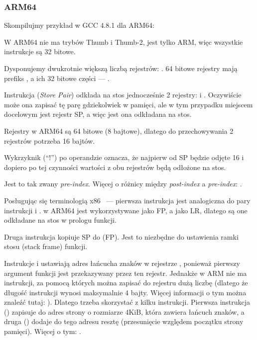 \subsubsection{ARM64}


Skompilujmy przykład w GCC 4.8.1 dla ARM64:



W ARM64 nie ma trybów Thumb i Thumb-2, jest tylko ARM, więc wszystkie instrukcje są 32 bitowe.

Dysponujemy dwukrotnie większą liczbą rejestrów: .
64 bitowe rejestry mają prefiks
, a ich 32 bitowe części --- .

Instrukcja  (\emph{Store Pair}) 
odkłada na stos jednocześnie 2 rejestry:  i .
Oczywiście może ona zapisać tę parę gdziekolwiek w pamięci, ale w tym przypadku miejscem docelowym jest rejestr \ac{SP}, a więc jest ona odkładana na stos.

Rejestry w ARM64 są 64 bitowe (8 bajtowe), dlatego do przechowywania 2 rejestrów potrzeba 16 bajtów.

Wykrzyknik (``!'') po operandzie oznacza, że najpierw od \ac{SP} będzie odjęte 16 i dopiero po tej czynności wartości z obu rejestrów będą odłożone na stos.

Jest to tak zwany \emph{pre-index}.
Więcej o różnicy między \emph{post-index} a \emph{pre-index}: .

Posługując się terminologią x86 ~--- pierwsza instrukcja jest analogiczna do pary instrukcji  i .
 w ARM64 jest wykorzystywane jako \ac{FP}, a  
jako \ac{LR}, dlatego są one odkładane na stos w prologu funkcji.

Druga instrukcja kopiuje \ac{SP} do  (\ac{FP}).
Jest to niezbędne do ustawienia ramki stosu (stack frame) funkcji.

\label{pointers_ADRP_and_ADD}
Instrukcje  i \ADD ustawiają adres łańcucha znaków  w rejestrze ,
ponieważ pierwszy argument funkcji jest przekazywany przez ten rejestr.
Jednakże w ARM nie ma instrukcji, za pomocą których można zapisać do rejestru dużą liczbę 
(dlatego że długość instrukcji wynosi maksymalnie 4 bajty. Więcej informacji o tym można znaleźć tutaj: ).
Dlatego trzeba skorzystać z kilku instrukcji.
Pierwsza instrukcja () zapisuje do  adres strony o rozmiarze 4KiB, która zawiera łańcuch znaków,
a druga (\ADD) dodaje do tego adresu resztę (przesunięcie względem początku strony pamięci).
Więcej o tym: .

